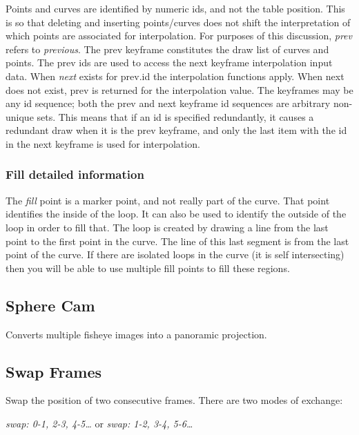 {Points and curves are identified by numeric ids, and not the table position. This is so that deleting and inserting points/curves does not shift the interpretation of which points are associated for interpolation. For purposes of this discussion, \textit{prev} refers to \textit{previous}. The prev keyframe constitutes the draw list of curves and points. The prev ids are used to access the next keyframe interpolation input data. When \textit{next} exists for prev.id the interpolation functions apply. When next does not exist, prev is returned for the interpolation value. The keyframes may be any id sequence; both the prev and next keyframe id sequences are arbitrary non-unique sets. This means that if an id is specified redundantly, it causes a redundant draw when it is the prev keyframe, and only the last item with the id in the next keyframe is used for interpolation.

\subsubsection*{Fill detailed information}%
\label{ssub:fill_detailed_information}

The \textit{fill} point is a marker point, and not really part of the curve. That point identifies the inside of the loop. It can also be used to identify the outside of the loop in order to fill that. The loop is created by drawing a line from the last point to the first point in the curve. The line of this last segment is from the last point of the curve. If there are isolated loops in the curve (it is self intersecting) then you will be able to use multiple fill points to fill these regions.

\subsection{Sphere Cam}%
\label{sub:sphere_cam}

Converts multiple fisheye images into a panoramic projection.

\subsection{Swap Frames}%
\label{sub:swap_frames}

Swap the position of two consecutive frames. There are two modes of exchange:

\qquad \textit{swap: 0-1, 2-3, 4-5\dots} \qquad or \qquad \textit{swap: 1-2, 3-4, 5-6\dots}

}
